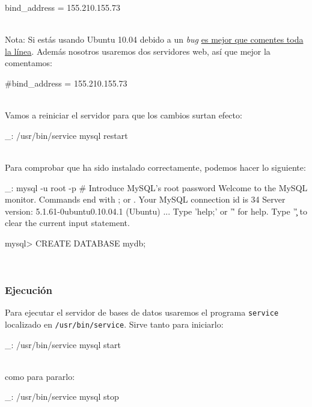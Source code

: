 \begin{bashcode}
bind_address = 155.210.155.73
\end{bashcode}
\\

Nota: Si estás usando Ubuntu 10.04 debido a un \emph{bug} \href{http://ubuntuforums.org/showthread.php?t=1479310}{es mejor que comentes toda la línea}. Además nosotros usaremos dos servidores web, así que mejor la comentamos:

\begin{bashcode}
#bind_address = 155.210.155.73
\end{bashcode}
\\

Vamos a reiniciar el servidor para que los cambios surtan efecto:

\begin{bashcode}
_: /usr/bin/service mysql restart
\end{bashcode}
\\

Para comprobar que ha sido instalado correctamente, podemos hacer lo siguiente:

\begin{bashcode}
_: mysql -u root -p     # Introduce MySQL's root password
Welcome to the MySQL monitor.  Commands end with ; or \g.
Your MySQL connection id is 34
Server version: 5.1.61-0ubuntu0.10.04.1 (Ubuntu)
...
Type 'help;' or '\h' for help. Type '\c' to clear the current input statement.

mysql> CREATE DATABASE mydb;
\end{bashcode}
\\


\subsubsection{Ejecución}

Para ejecutar el servidor de bases de datos usaremos el programa \texttt{service} localizado en \texttt{/usr/bin/service}. Sirve tanto para iniciarlo:

\begin{bashcode}
_: /usr/bin/service mysql start
\end{bashcode}
\\

como para pararlo:
\begin{bashcode}
_: /usr/bin/service mysql stop
\end{bashcode}
\\


